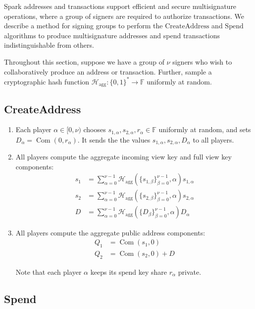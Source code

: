 \documentclass{llncs}
\newcommand{\F}{\mathbb{F}}
\newcommand{\hash}{\mathcal{H}}
\newcommand{\com}{\operatorname{Com}}
\begin{document}
Spark addresses and transactions support efficient and secure multisignature operations, where a group of signers are required to authorize transactions.
We describe a method for signing groups to perform the $\text{CreateAddress}$ and $\text{Spend}$ algorithms to produce multisignature addresses and spend transactions indistinguishable from others.

Throughout this section, suppose we have a group of $\nu$ signers who wish to collaboratively produce an address or transaction.
Further, sample a cryptographic hash function $\hash_{\text{agg}}: \{0,1\}^* \to \F$ uniformly at random.


\subsection{CreateAddress}

\begin{enumerate}
\item Each player $\alpha \in [0,\nu)$ chooses $s_{1,\alpha}, s_{2,\alpha}, r_\alpha \in \F$ uniformly at random, and sets $D_\alpha = \com(0, r_\alpha)$.
It sends the the values $s_{1,\alpha}, s_{2,\alpha}, D_\alpha$ to all players.
\item All players compute the aggregate incoming view key and full view key components:
\begin{align*}
s_1 &= \sum_{\alpha=0}^{\nu-1} \hash_{\text{agg}}\left( \{s_{1,\beta}\}_{\beta=0}^{\nu-1}, \alpha \right) s_{1,\alpha} \\
s_2 &= \sum_{\alpha=0}^{\nu-1} \hash_{\text{agg}}\left( \{s_{2,\beta}\}_{\beta=0}^{\nu-1}, \alpha \right) s_{2,\alpha} \\
D &= \sum_{\alpha=0}^{\nu-1} \hash_{\text{agg}}\left( \{D_\beta\}_{\beta=0}^{\nu-1}, \alpha \right) D_\alpha
\end{align*}
\item All players compute the aggregate public address components:
\begin{align*}
Q_1 &= \com(s_1, 0) \\
Q_2 &= \com(s_2, 0) + D
\end{align*}

Note that each player $\alpha$ keeps its spend key share $r_\alpha$ private.
\end{enumerate}


\subsection{Spend}
\end{document}
